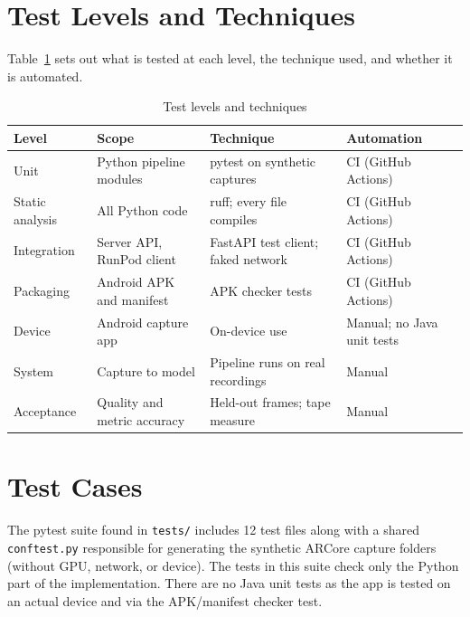 \section{Test Levels and Techniques}

Table~\ref{tab:testlevels} sets out what is tested at each level, the technique used, and whether it is automated.

\begin{table}[htbp]
\centering
\small
\caption{Test levels and techniques}
\label{tab:testlevels}
\begin{tabular}{p{2.5cm}p{3cm}p{3cm}p{2.5cm}}
\toprule
\textbf{Level} & \textbf{Scope} & \textbf{Technique} & \textbf{Automation} \\
\midrule
Unit & Python pipeline modules & pytest on synthetic captures & CI (GitHub Actions) \\
Static analysis & All Python code & ruff; every file compiles & CI (GitHub Actions) \\
Integration & Server API, RunPod client & FastAPI test client; faked network & CI (GitHub Actions) \\
Packaging & Android APK and manifest & APK checker tests & CI (GitHub Actions) \\
Device & Android capture app & On-device use & Manual; no Java unit tests \\
System & Capture to model & Pipeline runs on real recordings & Manual \\
Acceptance & Quality and metric accuracy & Held-out frames; tape measure & Manual \\
\bottomrule
\end{tabular}
\end{table}

\section{Test Cases}

The pytest suite found in \texttt{tests/} includes 12 test files along with a shared \texttt{conftest.py} responsible for generating the synthetic ARCore capture folders (without GPU, network, or device). The tests in this suite check only the Python part of the implementation. There are no Java unit tests as the app is tested on an actual device and via the APK/manifest checker test.


